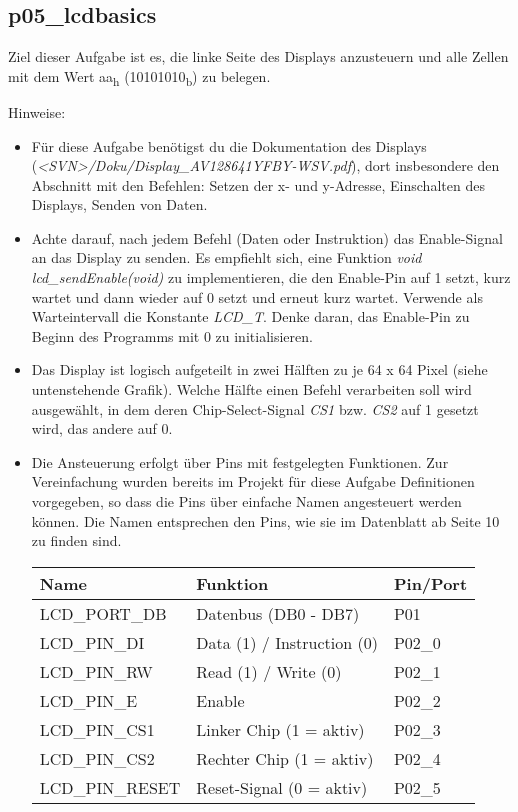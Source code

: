 \subsection{p05\_lcdbasics}
Ziel dieser Aufgabe ist es, die linke Seite des Displays anzusteuern und alle Zellen mit dem Wert aa\textsubscript{h} (10101010\textsubscript{b}) zu belegen.

Hinweise:
\begin{itemize}
\item
Für diese Aufgabe benötigst du die Dokumentation des Displays (\textit{<SVN>/Doku/Display\_AV128641YFBY-WSV.pdf}), dort insbesondere den Abschnitt mit den Befehlen: Setzen der x- und y-Adresse, Einschalten des Displays, Senden von Daten.

\item
Achte darauf, nach jedem Befehl (Daten oder Instruktion) das Enable-Signal an das Display zu senden.
Es empfiehlt sich, eine Funktion \textit{void lcd\_sendEnable(void)} zu implementieren, die den Enable-Pin auf 1 setzt, kurz wartet und dann wieder auf 0 setzt und erneut kurz wartet.
Verwende als Warteintervall die Konstante \emph{LCD\_T}.
Denke daran, das Enable-Pin zu Beginn des Programms mit 0 zu initialisieren.

\item
Das Display ist logisch aufgeteilt in zwei Hälften zu je 64 x 64 Pixel (siehe untenstehende Grafik).
Welche Hälfte einen Befehl verarbeiten soll wird ausgewählt, in dem deren Chip-Select-Signal \emph{CS1} bzw. \emph{CS2} auf 1 gesetzt wird, das andere auf 0.

\item
Die Ansteuerung erfolgt über Pins mit festgelegten Funktionen. Zur Vereinfachung wurden bereits im Projekt für diese Aufgabe Definitionen vorgegeben, so dass die Pins über einfache Namen angesteuert werden können. Die Namen entsprechen den Pins, wie sie im Datenblatt ab Seite 10 zu finden sind.

\begin{center}
\begin{tabular}{l|l|l}
	\toprule
\textbf{Name} & \textbf{Funktion} & \textbf{Pin/Port} \\ 
 \midrule
LCD\_PORT\_DB & Datenbus (DB0 - DB7) & P01 \\ 
LCD\_PIN\_DI & Data (1) / Instruction (0) & P02\_0 \\ 
LCD\_PIN\_RW & Read (1) / Write (0) & P02\_1 \\ 
LCD\_PIN\_E & Enable & P02\_2 \\ 
LCD\_PIN\_CS1 & Linker Chip (1 = aktiv) & P02\_3 \\ 
LCD\_PIN\_CS2 & Rechter Chip (1 = aktiv) & P02\_4 \\ 
LCD\_PIN\_RESET & Reset-Signal (0 = aktiv) & P02\_5 \\ 
\bottomrule
\end{tabular}
\end{center}


\end{itemize}
